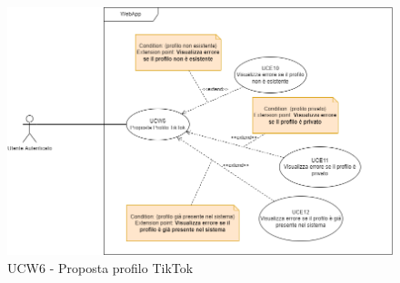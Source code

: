 \begin{figure}[!h]
\centering
\includegraphics[scale=0.5]{UC_images/UCW6.png}
\caption{UCW6 - Proposta profilo TikTok}
\end{figure}
